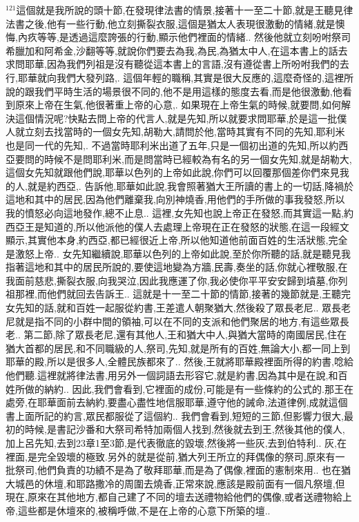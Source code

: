 \documentclass{book}
\begin{document}
$^{121}$這個就是我所說的頭十節,在發現律法書的情景,接著十一至二十節,就是王聽見律法書之後,他有一些行動,他立刻撕裂衣服,這個是猶太人表現很激動的情緒,就是懊悔,內疚等等,是透過這麼誇張的行動,顯示他們裡面的情緒..
然後他就立刻吩咐祭司希臘加和阿希金,沙翻等等,就說你們要去為我,為民,為猶太中人,在這本書上的話去求問耶華,因為我們列祖是沒有聽從這本書上的言語,沒有遵從書上所吩咐我們的去行,耶華就向我們大發列路,.
這個年輕的職稱,其實是很大反應的,這麼奇怪的,這裡所說的跟我們平時生活的場景很不同的,他不是用這樣的態度去看,而是他很激動,他看到原來上帝在生氣,他很著重上帝的心意,.
如果現在上帝生氣的時候,就要問,如何解決這個情況呢?快點去問上帝的代言人,就是先知,所以就要求問耶華,於是這一批僕人就立刻去找當時的一個女先知,胡勒大,請問於他,當時其實有不同的先知,耶利米也是同一代的先知,.
不過當時耶利米出道了五年,只是一個初出道的先知,所以約西亞要問的時候不是問耶利米,而是問當時已經較為有名的另一個女先知,就是胡勒大,這個女先知就跟他們說,耶華以色列的上帝如此說,你們可以回覆那個差你們來見我的人,就是約西亞,.
告訴他,耶華如此說,我會照著猶大王所讀的書上的一切話,降禍於這地和其中的居民,因為他們離棄我,向別神燒香,用他們的手所做的事我發怒,所以我的憤怒必向這地發作,總不止息..
這裡,女先知也說上帝正在發怒,而其實這一點,約西亞王是知道的,所以他派他的僕人去處理上帝現在正在發怒的狀態,在這一段經文顯示,其實他本身,約西亞,都已經很近上帝,所以他知道他前面百姓的生活狀態,完全是激怒上帝..
女先知繼續說,耶華以色列的上帝如此說,至於你所聽的話,就是聽見我指著這地和其中的居民所說的,要使這地變為方牆,民壽,奏坐的話,你就心裡敬服,在我面前慈悲,撕裂衣服,向我哭泣,因此我應運了你,我必使你平平安安歸到墳墓,你列祖那裡,而他們就回去告訴王..
這就是十一至二十節的情節,接著的幾節就是,王聽完女先知的話,就和百姓一起服從約書,王差遣人朝聚猶大,然後殺了眾長老尼..
眾長老尼就是指不同的小群中間的領袖,可以在不同的支派和他們聚居的地方,有這些眾長老..
第二節,除了眾長老尼,還有其他人,王和猶大中人,與猶大當時的南國居民,住在猶大首都的居民,和不同職級的人,祭司,先知,就是所有的百姓,無論大小,都一同上到耶華的殿,所以是很多人,全體民族都來了..
然後,王就將耶華殿裡面所得的約書,唸給他們聽.這裡就將律法書,用另外一個詞語去形容它,就是約書,因為其中是在說,和百姓所做的納約..
因此,我們會看到,它裡面的成份,可能是有一些條約的公式的.那王在處旁,在耶華面前去納約,要盡心盡性地信服耶華,遵守他的誡命,法道律例,成就這個書上面所記的約言,眾民都服從了這個約..
我們會看到,短短的三節,但影響力很大,最初的時候,是書記沙番和大祭司希特加兩個人找到,然後就去到王,然後其他的僕人,加上呂先知,去到23章1至3節,是代表徹底的毀壞,然後將一些灰,去到伯特利..
灰,在裡面,是完全毀壞的極致.另外的就是從前,猶大列王所立的拜偶像的祭司,原來有一批祭司,他們負責的功績不是為了敬拜耶華,而是為了偶像,裡面的憲制來用..
也在猶大城邑的休壇,和耶路撒冷的周圍去燒香,正常來說,應該是殿前面有一個凡祭壇,但現在,原來在其他地方,都自己建了不同的壇去送禮物給他們的偶像,或者送禮物給上帝,這些都是休壇來的,被稱呼做,不是在上帝的心意下所築的壇..
\end{document}

